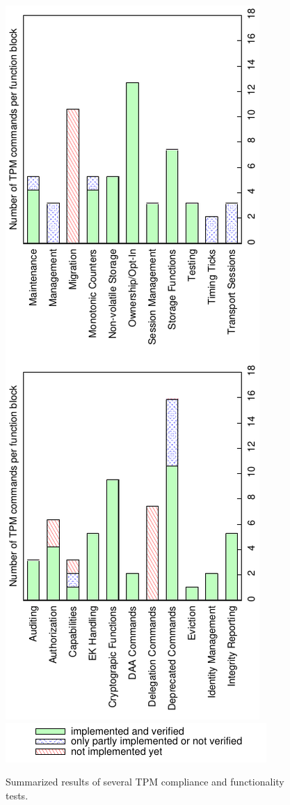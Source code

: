 \documentclass[runningheads]{llncs}
\begin{document}
\begin{figure}
	\begin{center}
		\includegraphics[angle=-90,scale=0.6]{plots/compliance}
		\includegraphics[origin=br,angle=90,scale=0.6]{plots/compliance_key}
		\caption{Summarized results of several TPM compliance and functionality
			tests.}
		\label{plot:compliance}
	\end{center}
\end{figure}
\end{document}
